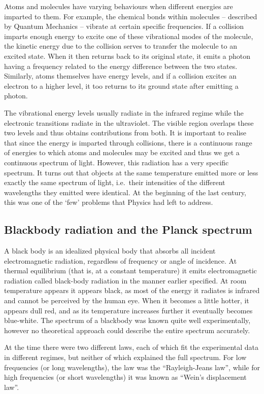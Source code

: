 Atoms and molecules have varying behaviours when different energies are imparted to them. For example, the chemical bonds within molecules -- described by Quantum Mechanics -- vibrate at certain specific frequencies. If a collision imparts enough energy to excite one of these vibrational modes of the molecule, the kinetic energy due to the collision serves to transfer the molecule to an excited state. When it then returns back to its original state, it emits a photon having a frequency related to the energy difference between the two states. Similarly, atoms themselves have energy levels, and if a collision excites an electron to a higher level, it too returns to its ground state after emitting a photon.

The vibrational energy levels usually radiate in the infrared regime while the electronic transitions radiate in the ultraviolet. The visible region overlaps these two levels and thus obtains contributions from both. It is important to realise that since the energy is imparted through collisions, there is a continuous range of energies to which atoms and molecules may be excited and thus we get a continuous spectrum of light. However, this radiation has a very specific spectrum. It turns out that objects at the same temperature emitted more or less exactly the same spectrum of light, i.e.\ their intensities of the different wavelengths they emitted were identical. At the beginning of the last century, this was one of the `few' problems that Physics had left to address.

\subsection{Blackbody radiation and the Planck spectrum}

A black body is an idealized physical body that absorbs all incident electromagnetic radiation, regardless of frequency or angle of incidence. At thermal equilibrium (that is, at a constant temperature) it emits electromagnetic radiation called black-body radiation in the manner earlier specified. At room temperature appears it appears black, as most of the energy it radiates is infrared and cannot be perceived by the human eye. When it becomes a little hotter, it appears dull red, and as its temperature increases further it eventually becomes blue-white. The spectrum of a blackbody was known quite well experimentally, however no theoretical approach could describe the entire spectrum accurately.

At the time there were two different laws, each of which fit the experimental data in different regimes, but neither of which explained the full spectrum. For low frequencies (or long wavelengths), the law was the ``Rayleigh-Jeans law'', while for high frequencies (or short wavelengths) it was known as ``Wein's displacement law''.

